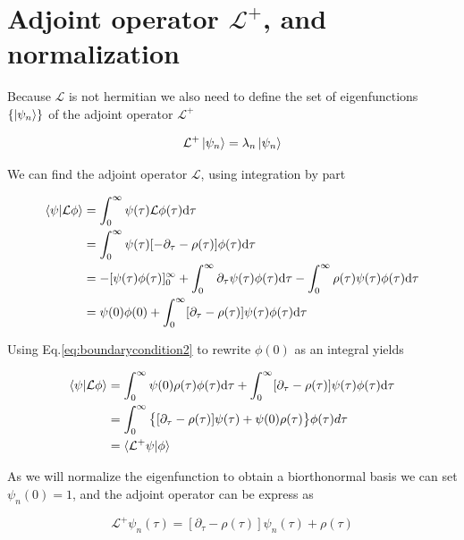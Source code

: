 \documentclass[12pt,twoside]{report}
\def \dd  {{\rm d}}
\begin{document}
\section{Adjoint operator $\mathcal{L}^+$, and normalization}
\label{sec:adop}

Because $\mathcal{L}$ is not hermitian we also need to define the set of eigenfunctions $\{\ket{\psi_n}\}$ of the adjoint operator $\mathcal{L}^{+}$

\begin{equation}
\label{eq:Ldegaoperator}
\mathcal{L}^+\ket{\psi_n}=\lambda_n\ket{\psi_n}
\end{equation}

We can find the adjoint operator $\mathcal{L}$, using integration by part

\begin{align}
\langle\psi|\mathcal{L}\phi\rangle&= \int_{0}^{\infty}\psi(\tau)\mathcal{L}\phi(\tau)\dd\tau  \nonumber \\
&= \int_{0}^{\infty}\psi(\tau)[-\partial_{\tau}-\rho(\tau)]\phi(\tau)\dd\tau  \nonumber \\
&=-[\psi(\tau)\phi(\tau)]^{\infty}_{0}+\int_{0}^{\infty}\partial_{\tau}\psi(\tau)\phi(\tau)\dd\tau -\int_{0}^{\infty}\rho(\tau)\psi(\tau)\phi(\tau)\dd\tau \nonumber \\
&= \psi(0)\phi(0)+ \int_{0}^{\infty}[\partial_{\tau}-\rho(\tau)]\psi(\tau)\phi(\tau)\dd\tau  \nonumber \\
\end{align}

Using Eq.\eqref{eq:boundarycondition2} to rewrite $\phi(0)$ as an integral yields

\begin{align}
\langle\psi|\mathcal{L}\phi\rangle&=\int_{0}^{\infty} \psi(0)\rho(\tau)\phi(\tau)\dd\tau+ \int_{0}^{\infty}[\partial_{\tau}-\rho(\tau)]\psi(\tau)\phi(\tau)\dd\tau  \nonumber \\
&= \int_{0}^{\infty}\big\{[\partial_{\tau}-\rho(\tau)]\psi(\tau)+ \psi(0)\rho(\tau)\big\}\phi(\tau)d\tau  \nonumber \\
& = \langle\mathcal{L}^+\psi|\phi\rangle
\end{align}

As we will normalize the eigenfunction to obtain a biorthonormal basis we can set $\psi_n(0)=1$, and the adjoint operator can be express as

\begin{equation}
\label{eq:Ldega}
\mathcal{L}^+\psi_n(\tau)=[\partial_{\tau}-\rho(\tau)]\psi_n(\tau)+\rho(\tau)
\end{equation}
\end{document}
